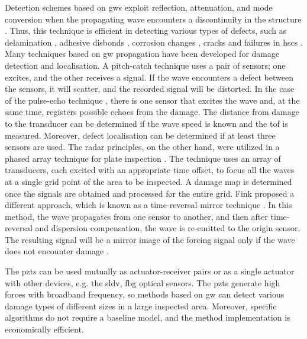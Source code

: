 Detection schemes based on \acp{gw} exploit reflection, attenuation, and mode conversion when the propagating wave encounters a discontinuity in the structure \cite{alleyne1992interaction}.
Thus, this technique is efficient in detecting various types of defects, such as delamination \cite{sohn2011delamination,tian2015delamination}, adhesive disbonds \cite{rucka2018damage,balasubramaniam2021ultrasonic}, corrosion changes \cite{alleyne1995long,lowe1998defect}, cracks \cite{tua2004detection,lu2006crack,zima2020detection} and failures in \acp{hsc} \cite{mustapha2011assessment, sikdar2016guided, sikdar2016ultrasonic,radzienski2016assessment, yu2019core}.
Many techniques based on \ac{gw} propagation have been developed for damage detection and localisation.
A pitch-catch technique \cite{ihn2008pitch, sikdar2017structural} uses a pair of sensors; one excites, and the other receives a signal.
If the wave encounters a defect between the sensors, it will scatter, and the recorded signal will be distorted.
In the case of the pulse-echo technique \cite{guo1993interaction, kudela2008damage}, there is one sensor that excites the wave and, at the same time, registers possible echoes from the damage.
The distance from damage to the transducer can be determined if the wave speed is known and the \ac{tof} is measured.
Moreover, defect localisation can be determined if at least three sensors are used.
The radar principles, on the other hand,  were utilized in a phased array technique for plate inspection \cite{giurgiutiu2004embedded, ostachowicz2008elastic, kudela2018structural}.
The technique uses an array of transducers, each excited with an appropriate time offset, to focus all the waves at a single grid point of the area to be inspected.
A damage map is determined once the signals are obtained and processed for the entire grid.
Fink proposed a different approach, which is known as a time-reversal mirror technique \cite{fink1992time}.
In this method, the wave propagates from one sensor to another, and then after time-reversal and dispersion compensation, the wave is re-emitted to the origin sensor.
The resulting signal will be a mirror image of the forcing signal only if the wave does not encounter damage \cite{park2007time, eremin2016analytically}.

The \acp{pzt} can be used mutually as actuator-receiver pairs or as a single actuator with other devices, e.g. the \ac{sldv}, \ac{fbg} optical sensors.
The \acp{pzt} generate high forces with broadband frequency, so methods based on \ac{gw} can detect various damage types of different sizes in a large inspected area.
Moreover, specific algorithms do not require a baseline model, and the method implementation is economically efficient.

